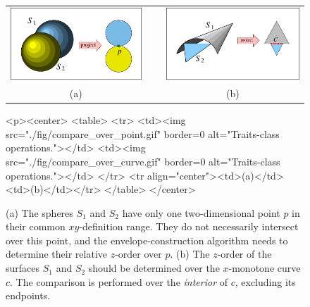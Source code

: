 \begin{figure}[t]
\begin{ccTexOnly}
  \begin{center}
  \begin{tabular}{ccc}
    \includegraphics{Envelope_3/fig/compare_over_point} & ~ &
    \includegraphics{Envelope_3/fig/compare_over_curve} \\
    {\small (a)} & ~ & {\small (b)}
  \end{tabular}
  \end{center}
\end{ccTexOnly}
\begin{ccHtmlOnly}
  <p><center>
  <table>
  <tr>
  <td><img src="./fig/compare_over_point.gif" border=0 alt="Traits-class operations."></td>
  <td><img src="./fig/compare_over_curve.gif" border=0 alt="Traits-class operations."></td>
  </tr>
  <tr align="center"><td>(a)</td><td>(b)</td></tr>
  </table>
  </center>
\end{ccHtmlOnly}
\caption{(a) The spheres $S_1$ and $S_2$ have only one
two-dimensional point $p$ in their common $xy$-definition range. They
do not necessarily intersect over this point, and the
envelope-construction algorithm needs to determine their relative
$z$-order over $p$. (b) The $z$-order of the surfaces $S_1$ and $S_2$
should be determined over the $x$-monotone curve $c$. The comparison
is performed over the {\em interior} of $c$, excluding its
endpoints.\label{env3_fig:comp_over}}
\end{figure}

